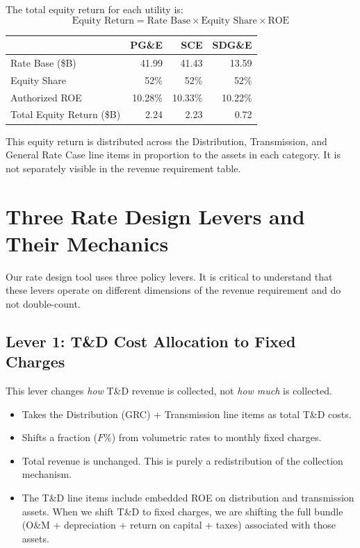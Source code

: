 \documentclass[11pt]{article}
\begin{document}
The total equity return for each utility is:
\begin{equation}
    \text{Equity Return} = \text{Rate Base} \times \text{Equity Share} \times \text{ROE}
\end{equation}

\begin{table}[htbp]
\centering
\begin{tabular}{l r r r}
\toprule
& \textbf{PG\&E} & \textbf{SCE} & \textbf{SDG\&E} \\
\midrule
Rate Base (\$B) & 41.99 & 41.43 & 13.59 \\
Equity Share & 52\% & 52\% & 52\% \\
Authorized ROE & 10.28\% & 10.33\% & 10.22\% \\
Total Equity Return (\$B) & 2.24 & 2.23 & 0.72 \\
\bottomrule
\end{tabular}
\end{table}

This equity return is distributed across the Distribution, Transmission, and General Rate Case line items in proportion to the assets in each category. It is not separately visible in the revenue requirement table.

\section{Three Rate Design Levers and Their Mechanics}

Our rate design tool uses three policy levers. It is critical to understand that these levers operate on different dimensions of the revenue requirement and do not double-count.

\subsection{Lever 1: T\&D Cost Allocation to Fixed Charges}

This lever changes \textit{how} T\&D revenue is collected, not \textit{how much} is collected.

\begin{itemize}
    \item Takes the Distribution (GRC) + Transmission line items as total T\&D costs.
    \item Shifts a fraction ($F\%$) from volumetric rates to monthly fixed charges.
    \item Total revenue is unchanged. This is purely a redistribution of the collection mechanism.
    \item The T\&D line items include embedded ROE on distribution and transmission assets. When we shift T\&D to fixed charges, we are shifting the full bundle (O\&M + depreciation + return on capital + taxes) associated with those assets.
\end{itemize}
\end{document}
